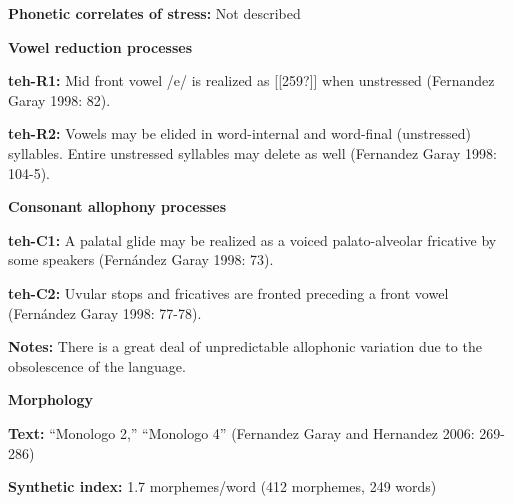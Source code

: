 \begin{styleBody}
\textbf{Phonetic correlates of stress: }Not described
\end{styleBody}

\begin{styleBody}
\textbf{Vowel reduction processes}
\end{styleBody}

\begin{styleBody}
\textbf{teh-R1:} Mid front vowel /e/ is realized as [[259?]] when unstressed (Fernandez Garay 1998: 82).
\end{styleBody}

\begin{styleBody}
\textbf{teh-R2: }Vowels may be elided in word-internal and word-final (unstressed) syllables. Entire unstressed syllables may delete as well (Fernandez Garay 1998: 104-5).
\end{styleBody}

\begin{styleBody}
\textbf{Consonant allophony processes}
\end{styleBody}

\begin{styleBody}
\textbf{teh-C1: }A palatal glide may be realized as a voiced palato-alveolar fricative by some speakers (Fernández Garay 1998: 73).
\end{styleBody}

\begin{styleBody}
\textbf{teh-C2: }Uvular stops and fricatives are fronted preceding a front vowel (Fernández Garay 1998: 77-78).
\end{styleBody}

\begin{styleBody}
\textbf{Notes: }There is a great deal of unpredictable allophonic variation due to the obsolescence of the language.
\end{styleBody}

\begin{styleBody}
\textbf{Morphology}
\end{styleBody}

\begin{styleBody}
\textbf{Text:} “Monologo 2,” “Monologo 4” (Fernandez Garay and Hernandez 2006: 269-286)
\end{styleBody}

\begin{styleBody}
\textbf{Synthetic index: }1.7 morphemes/word (412 morphemes, 249 words)
\end{styleBody}

